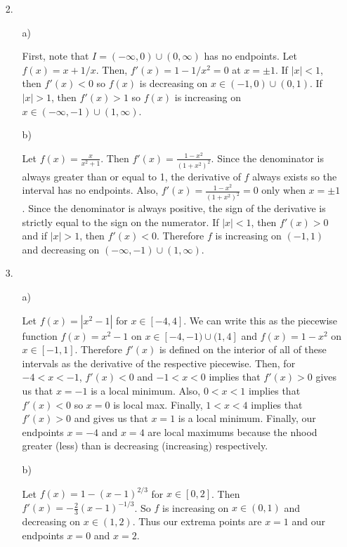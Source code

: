 \documentclass[letter paper, 11pt]{article}
\begin{document}
\begin{itemize}
    \item[2.]
    \begin{itemize}
        \item[a)]
        
            First, note that $I= (-\infty,0)\cup(0,\infty)$ has no endpoints. Let $f(x) = x + 1/x$. Then, $f'(x) = 1-1/x^2 = 0$ at $x = \pm 1$. If $|x| < 1$, then $f'(x) < 0$ so $f(x)$ is decreasing on $x\in (-1,0)\cup(0,1)$. If $|x|>1$, then $f'(x)>1$ so $f(x)$ is increasing on $x\in(-\infty,-1)\cup(1,\infty)$.
        
        \item[b)]
        
            Let $f(x) = \frac{x}{x^2+1}$. Then $f'(x) = \frac{1-x^2}{(1+x^2)^2}$. Since the denominator is always greater than or equal to 1, the derivative of $f$ always exists so the interval has no endpoints. Also, $f'(x) = \frac{1-x^2}{(1+x^2)^2} = 0$ only when $x=\pm 1$. Since the denominator is always positive, the sign of the derivative is strictly equal to the sign on the numerator. If $|x|<1$, then $f'(x) > 0$ and if $|x|>1$, then $f'(x) < 0$. Therefore $f$ is increasing on $(-1,1)$ and decreasing on $(-\infty,-1)\cup(1,\infty)$.
        
    \end{itemize}
    
    \item[3.]
    \begin{itemize}
        \item[a)]
        
            Let $f(x) = |x^2-1|$ for $x\in [-4,4]$. We can write this as the piecewise function $f(x) = x^2 - 1$ on $x\in[-4,-1)\cup(1,4]$ and $f(x) = 1-x^2$ on $x\in[-1,1]$. Therefore $f'(x)$ is defined on the interior of all of these intervals as the derivative of the respective piecewise. Then, for $-4< x<-1$, $f'(x) < 0$ and $-1<x<0$ implies that $f'(x) > 0$ gives us that $x=-1$ is a local minimum. Also, $0<x<1$ implies that $f'(x) < 0$ so $x=0$ is local max. Finally, $1<x<4$ implies that $f'(x) > 0$ and gives us that $x=1$ is a local minimum. Finally, our endpoints $x=-4$ and $x=4$ are local maximums because the nhood greater (less) than is decreasing (increasing) respectively.
        
        \item[b)]
        
            Let $f(x) = 1 - (x-1)^{2/3}$ for $x\in [0,2]$. Then $f'(x) = -\frac{2}{3}(x-1)^{-1/3}$. So $f$ is increasing on $x\in (0,1)$ and decreasing on $x\in(1,2)$. Thus our extrema points are $x=1$ and our endpoints $x=0$ and $x=2$.
        

\end{itemize}
\end{itemize}
\end{document}
